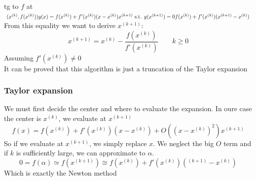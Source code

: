\begin{figure}[!ht]
    \begin{minipage}{\linewidth}
        \centering
    \end{minipage}
\end{figure}
tg to $f$ at $(x^{(k)},f(x^{(k)}))\\
y(x)=f(x^{(k)})+f'(x^{(k)})(x-x^{(k)})\\
x^{(k+1)}\text{ s.t. }y(x^{(k+1)})=0\\
f(x^{(k)})+f'(x^{(k)})(x^{(k+1)}-x^{(k)})
$\\
From this equality we want to derive $x^{(k+1)}$:\\
$$x^{(k+1)}=x^{(k)}-\frac{f(x^{(k)})}{f'(x^{(k)})}\qquad k\geq 0$$
Assuming $f'(x^{(k)})\neq 0$\\
It can be proved that this algorithm is just a truncation of the Taylor expansion
\subsubsection{Taylor expansion}
We must first decide the center and where to evaluate the expansion. In oure case the center is $x^{(k)}$, we evaluate at $x^{(k+1)}$
$$f(x)=f(x^{(k)})+f'(x^{(k)})(x-x^{(k)})+O\left((x-x^{(k)})^2\right)x^{(k+1)}$$
So if we evaluate at $x^{(k+1)}$, we simply replace $x$. We neglect the big $O$ term and if $k$ is sufficiently large, we can approximate to $\alpha$.
$$0=f(\alpha)\simeq f(x^{(k+1)})\cong f(x^{(k)})+f'(x^{(k)})(^{(k+1)}-x^{(k)})$$
Which is exactly the Newton method

